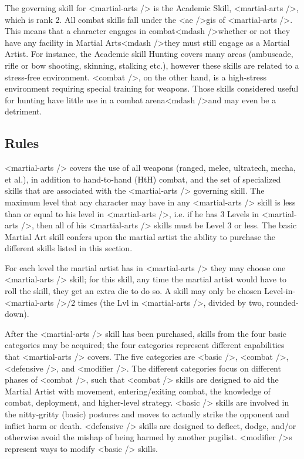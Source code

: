 The governing skill for <martial-arts /> is the Academic Skill,
<martial-arts />, which is rank 2.  All combat skills fall under
the <ae />gis of <martial-arts />. This means that a character engages in
combat<mdash />whether or not they have any facility in Martial
  Arts<mdash />they must still engage as a Martial Artist. For instance,
the Academic skill Hunting covers many areas (ambuscade, rifle
or bow shooting, skinning, stalking etc.), however these skills are
related to a stress-free environment. <combat />, on the other hand, is a
high-stress environment requiring special training for weapons. Those
skills considered useful for hunting have little use in a combat
arena<mdash />and may even be a detriment.

\subsection{Rules}

<martial-arts /> covers the use of all weapons (ranged, melee,
ultratech, mecha, et al.), in addition to hand-to-hand (HtH) combat,
and the set of specialized skills that are associated with the
<martial-arts /> governing skill.  The maximum level that any
character may have in any <martial-arts /> skill is less than or equal to
his level in <martial-arts />, i.e. if he has 3 Levels in <martial-arts />,
then all of his <martial-arts /> skills must be Level 3 or less.  The
basic Martial Art skill confers upon the martial artist the ability to
purchase the different skills listed in this section.

For each level the martial artist has in <martial-arts /> they may choose
one <martial-arts /> skill; for this skill, any time the martial artist
would have to roll the skill, they get an extra die to do so. A
skill may only be chosen
Level-in-<martial-arts />/2 times (the Lvl in
<martial-arts />, divided by two, rounded-down).


After the <martial-arts /> skill has been purchased, skills from
the four basic categories may be acquired; the four categories
represent different capabilities that <martial-arts /> covers. The
five categories are <basic />, <combat />,
<defensive />, and <modifier />. The different categories
focus on different phases of <combat />, such that <combat />
skills are designed to aid the Martial Artist with movement,
entering/exiting combat, the knowledge of combat, deployment, and
higher-level strategy. <basic /> skills are involved in the
nitty-gritty (basic) postures and moves to actually strike
the opponent and inflict harm or
death. <defensive /> skills are designed to deflect,
dodge, and/or otherwise avoid the mishap of being harmed by another
pugilist. <modifier />s represent ways to modify
<basic /> skills.

